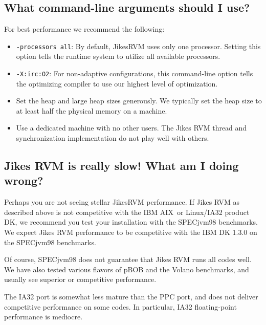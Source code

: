 \subsection{What command-line arguments should I use?}

For best performance we recommend the following:

\begin{itemize}
\item {\tt -processors all}: By default, Jikes\trademark RVM uses only
one processor.  Setting this option tells the runtime system to
utilize all available processors. 
\item {\tt -X:irc:O2}: For non-adaptive configurations, this command-line option tells the optimizing compiler to use our highest level of optimization.
\item Set the heap and large heap sizes generously.  We typically set the heap size to at least half the physical memory on a machine.
\item Use a dedicated machine with no other users.  The Jikes RVM thread and synchronization implementation do not play well with others.
\end{itemize}

\JikesTMFooter

\subsection{Jikes RVM is really slow! What am I doing wrong?}

Perhaps you are not seeing stellar Jikes\trademark RVM performance.
If Jikes RVM as 
described above is not competitive with the IBM AIX\AIXTMFootnote\ or
Linux/IA32 product DK, we recommend you test your installation with
the SPECjvm98 benchmarks.  We expect Jikes RVM performance to be competitive
with the IBM DK 1.3.0 on the SPECjvm98 benchmarks.

Of course, SPECjvm98 does not guarantee that Jikes RVM runs all codes
well.  We have also tested various flavors of pBOB and the Volano
benchmarks, and usually see superior or competitive performance.

The IA32 port is somewhat less mature than the PPC port, and does not
deliver competitive performance on some codes.  In particular, IA32
floating-point performance is mediocre.

